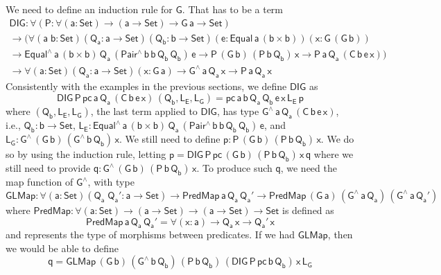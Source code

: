 \documentclass[acmsmall,screen,review,anonymous]{acmart}
\theoremstyle{definition}
\begin{document}
We need to define an induction rule for $\mathsf{G}$.
That has to be a term
\begin{multline}
\mathsf{DIG : \forall (P : \forall (a : Set) \to (a \to Set) \to G\,a \to Set)} \\
\mathsf{\to \Big( \forall (a\;b : Set) (Q_a : a \to Set) (Q_b : b \to Set) (e : Equal\,a\,(b \times b)) (x : G\,(G\,b))} \\
\mathsf{\to Equal^{\wedge}\,a\,(b \times b)\,Q_a\,(Pair^{\wedge}\,b\,b\,Q_b\,Q_b)\,e
	\to P\,(G\,b)\,(P\,b\,Q_b)\,x
	\to P\,a\,Q_a\,(C\,b\,e\,x) \Big)}\\
\mathsf{\to \forall (a : Set)(Q_a : a \to Set)(x : G\,a) \to G^{\wedge}\,a\,Q_a\,x \to P\,a\,Q_a\,x}
\end{multline}
Consistently with the examples in the previous sections, we define $\mathsf{DIG}$ as
\[
\mathsf{DIG\,P\,pc\,a\,Q_a\,(C\,b\,e\,x)\,(Q_b, L_E, L_G)
= pc\,a\,b\,Q_a\,Q_b\,e\,x\,L_E\,p}
\]
where $\mathsf{(Q_b, L_E, L_G)}$, the last term applied to $\mathsf{DIG}$, has type $\mathsf{G^{\wedge}\,a\,Q_a\,(C\,b\,e\,x)}$,
i.e., $\mathsf{Q_b : b \to Set}$, $\mathsf{L_E : Equal^{\wedge}\,a\,(b \times b)\,Q_a\,(Pair^{\wedge}\,b\,b\,Q_b\,Q_b)\,e}$,
and $\mathsf{L_G : G^{\wedge}\,(G\,b)\,(G^{\wedge}\,b\,Q_b)\,x}$.
We still need to define $\mathsf{p : P\,(G\,b)\,(P\,b\,Q_b)\,x}$.
We do so by using the induction rule, letting $\mathsf{p = DIG\,P\,pc\,(G\,b)\,(P\,b\,Q_b)\,x\,q}$
where we still need to provide $\mathsf{q : G^{\wedge}\,(G\,b)\,(P\,b\,Q_b)\,x}$.
To produce such $\mathsf{q}$, we need the map function of $\mathsf{G^{\wedge}}$, with type
\[
\mathsf{GLMap : \forall (a : Set) (Q_a\;Q_a' : a \to Set) \to PredMap\,a\,Q_a\,Q_a' \to PredMap\,(G\,a)\,(G^{\wedge}\,a\,Q_a)\,(G^{\wedge}\,a\,Q_a')}
\]
where $\mathsf{PredMap : \forall (a : Set) \to (a \to Set) \to (a \to Set) \to Set}$
is defined as
\[
\mathsf{PredMap\,a\,Q_a\,Q_a' = \forall (x : a) \to Q_a\,x \to Q_a'\,x}
\]
and represents the type of morphisms between predicates.
If we had $\mathsf{GLMap}$, then we would be able to define
\[
\mathsf{q = GLMap\,(G\,b)\,(G^{\wedge}\,b\,Q_b)\,(P\,b\,Q_b)\,(DIG\,P\,pc\,b\,Q_b)\,x\,L_G}
\]
\end{document}
